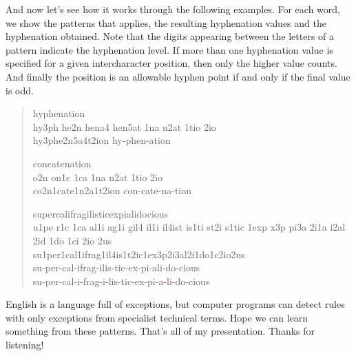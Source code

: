 \documentclass[11pt]{article}
\newenvironment{example}{%
  \begin{quotation}%
    \setlength{\parindent}{-\parindent}%
    \hyphenpenalty=10000%
    \ttfamily%
    \hspace{2.75\parindent}
  }{\end{quotation}}
\newcommand\bh{\textcolor{red}{-}}
\begin{document}
  And now let's see how it works through the following examples. For each word, we show the patterns that applies, the resulting hyphenation values and the hyphenation obtained. Note that the digits appearing between the letters of a pattern indicate the hyphenation level. If more than one hyphenation value is specified for a given intercharacter position, then only the higher value counts. And finally the position is an allowable hyphen point if and only if the final value is odd.

  \begin{example}
    hyphenation\\ hy3ph he2n hena4 hen5at 1na n2at 1tio 2io\\
    hy3phe2n5a4t2ion hy-phen-ation

    concatenation\\ o2n on1c 1ca 1na n2at 1tio 2io\\
    co2n1cate1n2a1t2ion con-cate-na-tion

    supercalifragilisticexpialidocious\\
      u1pe r1c 1ca al1i ag1i gil4 il1i il4ist is1ti st2i s1tic 1exp x3p pi3a 2i1a i2al 2id 1do 1ci 2io 2us\\
      su1per1cal1ifrag1il4is1t2ic1ex3p2i3al2i1do1c2io2us\\
      su-per-cal-ifrag-ilis-tic-ex-pi-ali-do-cious\\
      su-per-cal-i\bh frag-i\bh lis-tic-ex-pi-a\bh li-do-cious
  \end{example}

  English is a language full of exceptions, but computer programs can detect rules with only exceptions from specialist technical terms. Hope we can learn something from these patterns. That's all of my presentation. Thanks for listening!
\end{document}

